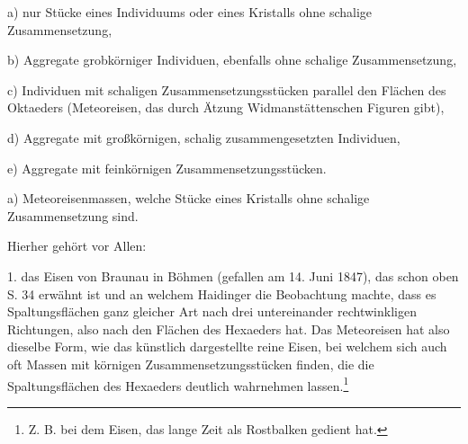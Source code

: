 \documentclass[a4paper, 11pt, oneside]{article}
\begin{document}
a) nur Stücke eines Individuums oder eines Kristalls ohne schalige Zusammensetzung,

b) Aggregate grobkörniger Individuen, ebenfalls ohne schalige Zusammensetzung,

c) Individuen mit schaligen Zusammensetzungsstücken parallel den Flächen des Oktaeders (Meteoreisen, das durch Ätzung Widmanstättenschen Figuren gibt),

d) Aggregate mit großkörnigen, schalig zusammengesetzten Individuen,

e) Aggregate mit feinkörnigen Zusammensetzungsstücken.

a) Meteoreisenmassen, welche Stücke eines Kristalls ohne schalige Zusammensetzung sind.

Hierher gehört vor Allen:

1. das Eisen von Braunau in Böhmen (gefallen am 14. Juni 1847), das schon oben S. 34 erwähnt ist und an welchem Haidinger die Beobachtung machte, dass es Spaltungsflächen ganz gleicher Art nach drei untereinander rechtwinkligen Richtungen, also nach den Flächen des Hexaeders hat. Das Meteoreisen hat also dieselbe Form, wie das künstlich dargestellte reine Eisen, bei welchem sich auch oft Massen mit körnigen Zusammensetzungsstücken finden, die die Spaltungsflächen des Hexaeders deutlich wahrnehmen lassen.\footnote{Z. B. bei dem Eisen, das lange Zeit als Rostbalken gedient hat.}
\end{document}

